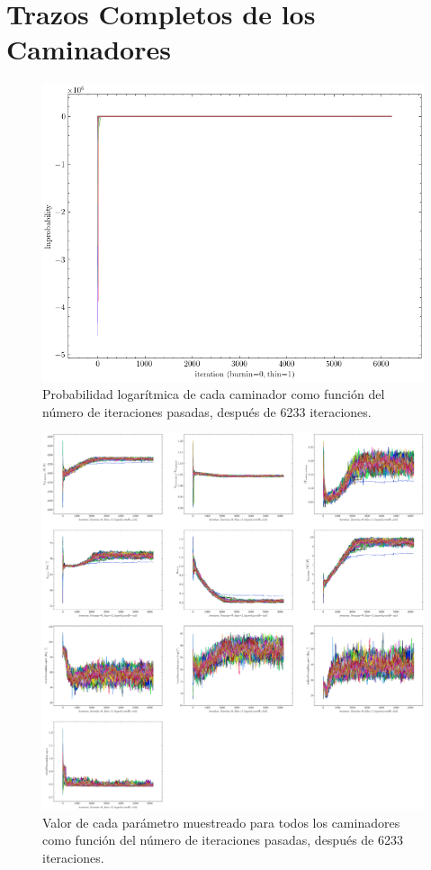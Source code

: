 \section{Trazos Completos de los Caminadores} \label{apendice:modelo_computacional_graficas:trazos_completos_caminadores}

\begin{figure}[!ht]
    \centering
    \includegraphics[scale=0.4]{Apendice/Figures/Figura Caminadores Trazo lnprobability 0 Burnin.png}
    \caption{Probabilidad logarítmica de cada caminador como función del número
    de iteraciones pasadas, después de 6233 iteraciones.}
\end{figure}

\begin{figure}[!ht]
    \centering
    \includegraphics[scale=0.2]{Apendice/Figures/Figura Caminadores Trazo Parametros 0 Burnin.png}
    \caption{Valor de cada parámetro muestreado para todos los caminadores como
    función del número de iteraciones pasadas, después de 6233 iteraciones.}
\end{figure}


